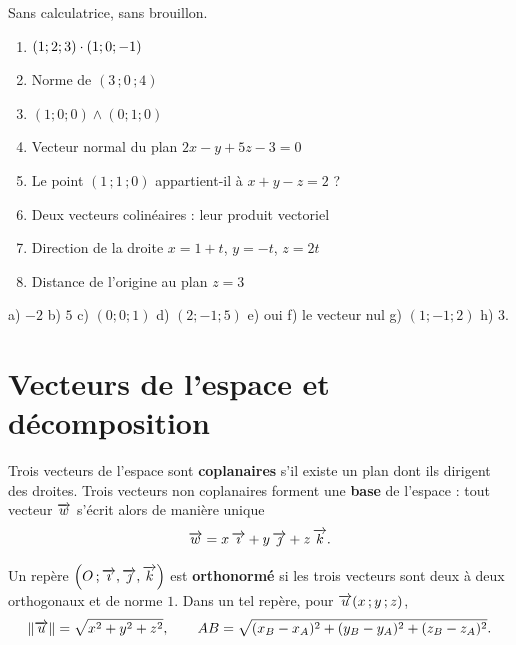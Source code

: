 \begin{automatismes}
Sans calculatrice, sans brouillon.

\begin{enumerate}[label=\textbf{\alph*)}, leftmargin=*, itemsep=0.25em]
  \item $(1;2;3) \cdot (1;0;-1)$
  \item Norme de $(3\,;0\,;4)$
  \item $(1;0;0) \wedge (0;1;0)$
  \item Vecteur normal du plan $2x-y+5z-3 = 0$
  \item Le point $(1\,;1\,;0)$ appartient-il à $x+y-z = 2$ ?
  \item Deux vecteurs colinéaires : leur produit vectoriel
  \item Direction de la droite $x = 1+t$, $y = -t$, $z = 2t$
  \item Distance de l'origine au plan $z = 3$
\end{enumerate}
\end{automatismes}

\begin{corrige}[automatismes]
a) $-2$ \quad b) $5$ \quad c) $(0;0;1)$ \quad d) $(2;-1;5)$ \quad
e) oui \quad f) le vecteur nul \quad g) $(1;-1;2)$ \quad h) $3$.
\end{corrige}

\section{Vecteurs de l'espace et décomposition}

\begin{definition}
Trois vecteurs de l'espace sont \textbf{coplanaires} s'il existe un plan dont
ils dirigent des droites. Trois vecteurs non coplanaires forment une
\textbf{base} de l'espace : tout vecteur $\overrightarrow{w}$ s'écrit alors de manière
unique
\[
  \overrightarrow{w} = x\,\overrightarrow{\imath}+y\,\overrightarrow{\jmath}+z\,\overrightarrow{k} .
\]
\end{definition}

\begin{propriete}
Un repère $\left(O\,;\overrightarrow{\imath},\overrightarrow{\jmath},\overrightarrow{k}\right)$ est \textbf{orthonormé} si les
trois vecteurs sont deux à deux orthogonaux et de norme $1$. Dans un tel
repère, pour $\overrightarrow{u}(x\,;y\,;z)$,
\[
  \left\lVert \overrightarrow{u} \right\rVert = \sqrt{x^{2}+y^{2}+z^{2}},
  \qquad
  AB = \sqrt{(x_{B}-x_{A})^{2}+(y_{B}-y_{A})^{2}+(z_{B}-z_{A})^{2}} .
\]
\end{propriete}

